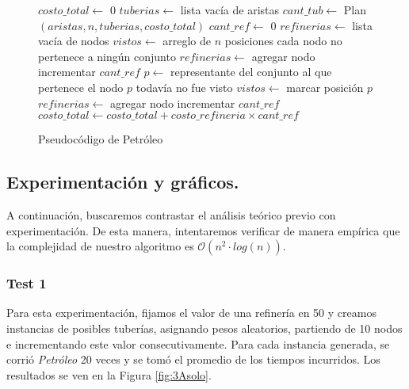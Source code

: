 \begin{figure}[!ht]
\begin{codebox}
\li $costo\_total \leftarrow$ 0
\li $tuberias \leftarrow$ lista vacía de aristas
\li $cant\_tub \leftarrow$ {\sc Plan}$(aristas,n,tuberias,costo\_total)$
\li $cant\_ref \leftarrow$ 0
\li $refinerias \leftarrow$ lista vacía de nodos
\li $vistos \leftarrow$ arreglo de $n$ posiciones
\li \For cada nodo
\li 	\Do
		\If no pertenece a ningún conjunto
\li		\Then
			$refinerias \leftarrow$ agregar nodo
\li			incrementar $cant\_ref$
\li		\Else 
\li 			$p \leftarrow$ representante del conjunto al que pertenece el nodo
\li			\If $p$ todavía no fue visto
\li			\Then
				$vistos \leftarrow$ marcar posición $p$
\li				$refinerias \leftarrow$ agregar nodo
\li				incrementar $cant\_ref$
			\End
		\End
	\End
\li	$costo\_total \leftarrow costo\_total + costo\_refineria \times cant\_ref$
\end{codebox} 
\caption{Pseudocódigo de Petróleo}\label{code:petroleo}
\end{figure}

\vspace*{0.6cm}

\subsection{Experimentación y gráficos.}

\vspace*{0.3cm}

A continuación, buscaremos contrastar el análisis teórico previo con experimentación.  De esta manera, intentaremos verificar de manera empírica que la complejidad de nuestro algoritmo es $\mathcal{O}(n^2 \cdot log(n))$.

\subsubsection{Test 1}

\vspace*{0.3cm}

Para esta experimentación, fijamos el valor de una refinería en 50 y creamos instancias de posibles tuberías, asignando pesos aleatorios, partiendo de 10 nodos e incrementando este valor consecutivamente.  Para cada instancia generada, se corrió {\it Petróleo} 20 veces y se tomó el promedio de los tiempos incurridos.  Los resultados se ven en la Figura \ref{fig:3Asolo}.

